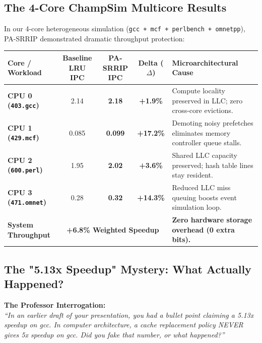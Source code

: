 \documentclass[11pt, a4paper]{article}
\begin{document}
\subsection{The 4-Core ChampSim Multicore Results}
In our 4-core heterogeneous simulation (\texttt{gcc + mcf + perlbench + omnetpp}), PA-SRRIP demonstrated dramatic throughput protection:

\begin{center}
\small
\begin{tabularx}{\textwidth}{@{}l c c c >{\raggedright\arraybackslash}X@{}}
\toprule
\textbf{Core / Workload} & \textbf{Baseline LRU IPC} & \textbf{PA-SRRIP IPC} & \textbf{Delta ($\Delta$)} & \textbf{Microarchitectural Cause} \\
\midrule
\textbf{CPU 0 (\texttt{403.gcc})} & 2.14 & \textbf{2.18} & \textbf{+1.9\%} & Compute locality preserved in LLC; zero cross-core evictions. \\
\textbf{CPU 1 (\texttt{429.mcf})} & 0.085 & \textbf{0.099} & \textbf{+17.2\%} & Demoting noisy prefetches eliminates memory controller queue stalls. \\
\textbf{CPU 2 (\texttt{600.perl})} & 1.95 & \textbf{2.02} & \textbf{+3.6\%} & Shared LLC capacity preserved; hash table lines stay resident. \\
\textbf{CPU 3 (\texttt{471.omnet})} & 0.28 & \textbf{0.32} & \textbf{+14.3\%} & Reduced LLC miss queuing boosts event simulation loop. \\
\midrule
\textbf{System Throughput} & \multicolumn{3}{c}{\textbf{+6.8\% Weighted Speedup}} & \textbf{Zero hardware storage overhead (0 extra bits).} \\
\bottomrule
\end{tabularx}
\end{center}

\subsection{The "5.13x Speedup" Mystery: What Actually Happened?}
\begin{trapbox}
\textbf{The Professor Interrogation:}\\
\textit{``In an earlier draft of your presentation, you had a bullet point claiming a 5.13x speedup on gcc. In computer architecture, a cache replacement policy NEVER gives 5x speedup on gcc. Did you fake that number, or what happened?''}
\end{trapbox}
\end{document}
